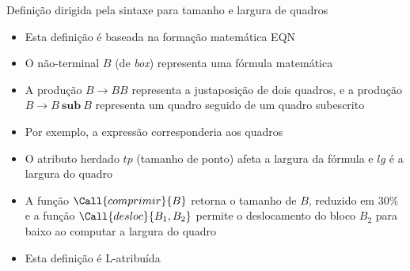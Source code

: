 \begin{frame}[fragile]{Definição dirigida pela sintaxe para tamanho e largura de quadros}

    \begin{itemize}
        \item Esta definição é baseada na formação matemática EQN
        \pause

        \item O não-terminal $B$ (de \textit{box}) representa uma fórmula matemática
        \pause

        \item A produção $B\to BB$ representa a justaposição de dois quadros, e a produção $B\to B\ \textbf{sub}\ B$ representa um quadro seguido de um
            quadro subescrito
        \pause

        \item Por exemplo, a expressão  corresponderia aos quadros
        \begin{figure}[h]
            \centering
        \end{figure}
        \pause

        \item O atributo herdado $tp$ (tamanho de ponto) afeta a largura da fórmula e $lg$ é a largura do quadro
        \pause

        \item A função $\Call{comprimir}{B}$ retorna o tamanho de $B$, reduzido em 30\% e a função $\Call{desloc}{B_1, B_2}$ permite o deslocamento do bloco
            $B_2$ para baixo ao computar a largura do quadro
        \pause

        \item Esta definição é L-atribuída
    \end{itemize}

\end{frame}

